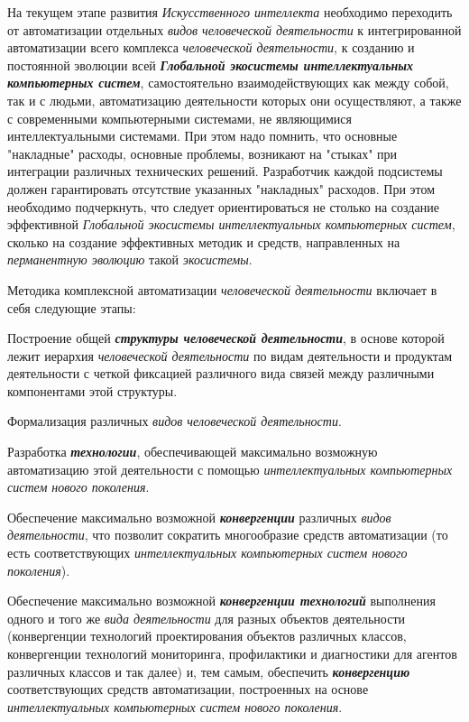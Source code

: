 На текущем этапе развития \textit{Искусственного интеллекта} необходимо переходить от автоматизации отдельных \textit{видов человеческой деятельности} к интегрированной автоматизации всего комплекса \textit{человеческой деятельности}, к созданию и постоянной эволюции всей \textbf{\textit{Глобальной экосистемы интеллектуальных компьютерных систем}}, самостоятельно взаимодействующих как между собой, так и с людьми, автоматизацию деятельности которых они осуществляют, а также с современными компьютерными системами, не являющимися интеллектуальными системами. При этом надо помнить, что основные "накладные"{} расходы, основные проблемы, возникают на "стыках"{} при интеграции различных технических решений. Разработчик каждой подсистемы должен гарантировать отсутствие указанных "накладных"{} расходов. При этом необходимо подчеркнуть, что следует ориентироваться не столько на создание эффективной \textit{Глобальной экосистемы интеллектуальных компьютерных систем}, сколько на создание эффективных методик и средств, направленных на \textit{перманентную эволюцию} такой \textit{экосистемы}.

Методика комплексной автоматизации \textit{человеческой деятельности} включает в себя следующие этапы:

\begin{textitemize}
	\item
	Построение общей \textbf{\textit{структуры человеческой деятельности}}, в основе которой лежит иерархия \textit{человеческой деятельности} по видам деятельности и продуктам деятельности с четкой фиксацией различного вида связей между различными компонентами этой структуры.
	\item
	Формализация различных \textit{видов человеческой деятельности}.
	\item
	Разработка \textbf{\textit{технологии}}, обеспечивающей максимально возможную автоматизацию этой деятельности с помощью \textit{интеллектуальных компьютерных систем нового поколения}.
	\item
	Обеспечение максимально возможной \textbf{\textit{конвергенции}} различных \textit{видов деятельности}, что позволит сократить многообразие средств автоматизации (то есть соответствующих \textit{интеллектуальных компьютерных систем нового поколения}).
	\item
	Обеспечение максимально возможной \textbf{\textit{конвергенции технологий}} выполнения одного и того же \textit{вида деятельности} для разных объектов деятельности (конвергенции технологий проектирования объектов различных классов, конвергенции технологий мониторинга, профилактики и диагностики для агентов различных классов и так далее) и, тем самым, обеспечить \textbf{\textit{конвергенцию}} соответствующих средств автоматизации, построенных на основе \textit{интеллектуальных компьютерных систем нового поколения}.
\end{textitemize}


